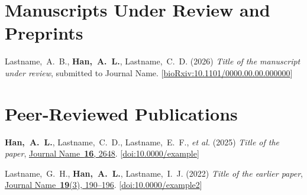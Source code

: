%
\newcommand{\doi}[1]{[\href{https://doi.org/#1}{doi:#1}]}
\newcommand{\biorxiv}[1]{[\href{https://doi.org/#1}{bioRxiv:#1}]}
\newcommand{\medrxiv}[1]{[\href{https://doi.org/#1}{medRxiv:#1}]}
\newcommand{\pmid}[1]{[\href{https://pubmed.ncbi.nlm.nih.gov/#1/}{PMID:#1}]}


\setcounter{numPubs}{3} %
\setcounter{pubCounter}{\value{numPubs}}


\section{Manuscripts Under Review and Preprints}
\secstartswithlist{}%
\begin{etaremune}[start=\value{pubCounter}]
\item
  Lastname,~A.~B.,
  {\bf Han,~A.~L.},
  Lastname,~C.~D.
  (2026)
  {\it Title of the manuscript under review},
  submitted to Journal Name.
  \biorxiv{10.1101/0000.00.00.000000}
\end{etaremune}
\setcounter{pubCounter}{\value{enumi}}\addtocounter{pubCounter}{-1}

\section{Peer-Reviewed Publications}
\secstartswithlist{}%
\begin{etaremune}[start=\value{pubCounter}]
\item
  {\bf Han,~A.~L.},
  Lastname,~C.~D.,
  Lastname,~E.~F.,
  {\it et al.}
  (2025)
  {\it Title of the paper},
  \href{https://doi.org/10.0000/example}{Journal Name~{\bf 16}, 2648}.
  \doi{10.0000/example}
\item
  Lastname,~G.~H.,
  {\bf Han,~A.~L.},
  Lastname,~I.~J.
  (2022)
  {\it Title of the earlier paper},
  \href{https://doi.org/10.0000/example2}{Journal Name~{\bf 19}(3), 190--196}.
  \doi{10.0000/example2}
\end{etaremune}


